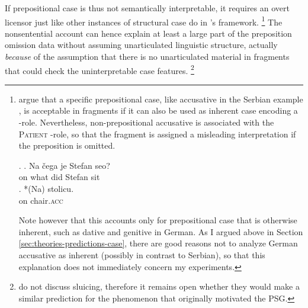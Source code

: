 If prepositional case is thus not semantically interpretable, it requires an overt licensor just like other instances of structural case do in \citeauthor{barton.progovac2005}'s framework.%
%
\footnote{\citet[342]{progovac.etal2006} argue that a specific prepositional case, like accusative in the Serbian example \Next, is acceptable in fragments if it can also be used as inherent case encoding a \texttheta-role. Nevertheless, non-prepositional accusative is associated with the \textsc{Patient} \texttheta-role, so that the fragment is assigned a misleading interpretation if the preposition is omitted. 

\ex. \ag. Na čega je Stefan seo?\\
	      on what did Stefan sit\\
	       
	 \bg. *(Na) stolicu.\\
	      on chair.\textsc{acc}\\
	      
Note however that this accounts only for prepositional case that is otherwise inherent, such as dative and genitive in German. As I argued above in Section \ref{sec:theories-predictions-case}, there are good reasons not to analyze German accusative as inherent (possibly in contrast to Serbian), so that this explanation does not immediately concern my experiments.}\afterfn%
%
The nonsentential account can hence explain at least a large part of the preposition omission data without assuming unarticulated linguistic structure, actually \textit{because} of the assumption that there is no unarticulated material in fragments that could check the uninterpretable case features.%
% 
\footnote{\citet{barton.progovac2005} do not discuss sluicing, therefore it remains open whether they would make a similar prediction for the phenomenon that originally motivated the PSG.}\afterfn%
%

